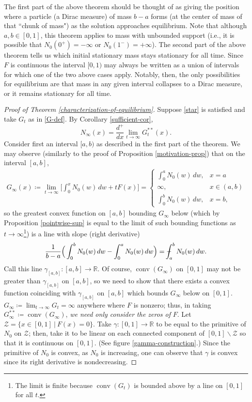 \documentclass[11pt]{article}
\numberwithin{equation}{section}
\def\Xint#1{\mathchoice
{\XXint\displaystyle\textstyle{#1}}%
{\XXint\textstyle\scriptstyle{#1}}%
{\XXint\scriptstyle\scriptscriptstyle{#1}}%
{\XXint\scriptscriptstyle\scriptscriptstyle{#1}}%
   \!\int}
\def\XXint#1#2#3{{\setbox0=\hbox{$#1{#2#3}{\int}$}
\vcenter{\hbox{$#2#3$}}\kern-.5\wd0}}
\def\dashint{\Xint-}
\DeclareMathOperator{\conv}{conv}
\begin{document}
The first part of the above theorem should be thought of as giving the position where a particle (a Dirac measure) of mass $b-a$ forms (at the center of mass of that ``chunk of mass") as the solution approaches equilibrium. Note that although $a, b\in [0,1]$, this theorem applies to mass with unbounded support (i.e., it is possible that $N_0(0^+)=-\infty$ or $N_0(1^-)=+\infty$). The second part of the above theorem tells us which initial stationary mass stays stationary for all time. Since  $F$ is continuous the interval $[0,1)$ may always be written as a union of intervals for which one of the two above cases apply. Notably, then, the only possibilities for equilibrium are that mass in any given interval collapses to a Dirac measure, or it remains stationary for all time. 

\begin{proof}[Proof of Theorem \ref{characterization-of-equilibrium}]
Suppose \eqref{star} is satisfied and take $G_t$ as in \eqref{G-def}. By Corollary \ref{sufficient-cor}, 
$$N_\infty(x)=\frac{d^+}{dx}\lim_{t\to\infty}G_t^{**}(x).$$ 
Consider first an interval $[a,b)$ as described in the first part of the theorem. We may observe (similarly to the proof of Proposition \ref{motivation-prop}) that on the interval $[a,b]$, 
\begin{align*}
    G_\infty(x)\coloneq\lim_{t\to\infty}\Big[\int_0^x N_0(w) \, dw+tF(x)\Big]=\begin{cases}
        \displaystyle\int_0^a N_0(w) \, dw, &x=a
        \\
        \infty, &x\in(a,b)
        \\
        \displaystyle\int_0^b N_0(w) \, dw, &x=b, 
    \end{cases}
\end{align*} 
so the greatest convex function on $[a,b]$ bounding $G_\infty$ below (which by Proposition \ref{pointwise-sup} is equal to the limit of such bounding functions as $t\to\infty$\footnote{The limit is finite because $\conv (G_t)$ is bounded above by a line on $[0,1]$ for all $t$.}) is a line with slope (right derivative)
\begin{align*}
    \frac{1}{b-a}\Big(\int_0^b N_0(w) \, dw-\int_0^a N_0(w) \, dw\Big)=\dashint_a^b N_0(w) \, dw. 
\end{align*}
Call this line $\gamma_{[a,b]}:[a,b]\to\mathbb{R}$. Of course, $\conv(G_\infty)$ on $[0,1]$ may not be greater than $\gamma_{[a,b]}$ on $[a, b]$, so we need to show that there exists a convex function coinciding with $\gamma_{[a,b]}$ on $[a, b]$ which bounds $G_\infty$ below on $[0,1]$. $G_\infty\coloneq\lim_{t\to\infty}G_t=\infty$ anywhere where $F$ is nonzero; thus, in taking $G_\infty^{**}\coloneq\conv(G_\infty)$, \textit{we need only consider the zeros of} $F$. Let $\mathcal{Z}=\{x\in[0,1] \ | \ F(x)=0\}$. Take $\gamma:[0,1]\to\mathbb{R}$ to be equal to the primitive of $N_0$ on $\mathcal{Z}$; then, take it to be linear on each connected component of $[0,1]\backslash\mathcal{Z}$ so that it is continuous on $[0,1]$. (See figure \ref{gamma-construction}.) Since the primitive of $N_0$ is convex, as $N_0$ is increasing, one can observe that $\gamma$ is convex since its right derivative is nondecreasing. 


\end{proof}
\end{document}
